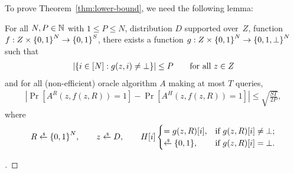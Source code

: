 \noindent
To prove Theorem~\ref{thm:lower-bound}, we need the following lemma:

\begin{lemma}
For all ${N,P\in{\mathbb{N}}}$ with ${1\leq P\leq N}$,
distribution $D$ supported over~$Z$,
function ${f:Z\times{\{0,1\}}^N\to{\{0,1\}}^S}$,
there exists a function ${g:Z\times\bit^N\to{\{0,1,\bot\}}^N}$ such that
\begin{align*}
|\{{i\in[N]}:{g(z,i)\neq\bot}\}|\leq P
\qquad\textup{for all }z\in Z
\end{align*}
and for all (non-efficient) oracle algorithm $A$ making at most $T$ queries,
\begin{align*}
\left|
\Pr\left[A^R(z,f(z,R))=1\right]
-
\Pr\left[A^H(z,f(z,R))=1\right]
\right|
\leq
\sqrt{\frac{ST}{2P}},
\end{align*}
where
\begin{align*}
R\draws\bit^N,\qquad
z\draws D,\qquad
H[i]\begin{cases}
=g(z,R)[i],&\textup{if }g(z,R)[i]\neq\bot;\\
\draws\bit,&\textup{if }g(z,R)[i]=\bot.
\end{cases}
\end{align*}
\end{lemma}

\begin{proof}[]
\end{proof}
